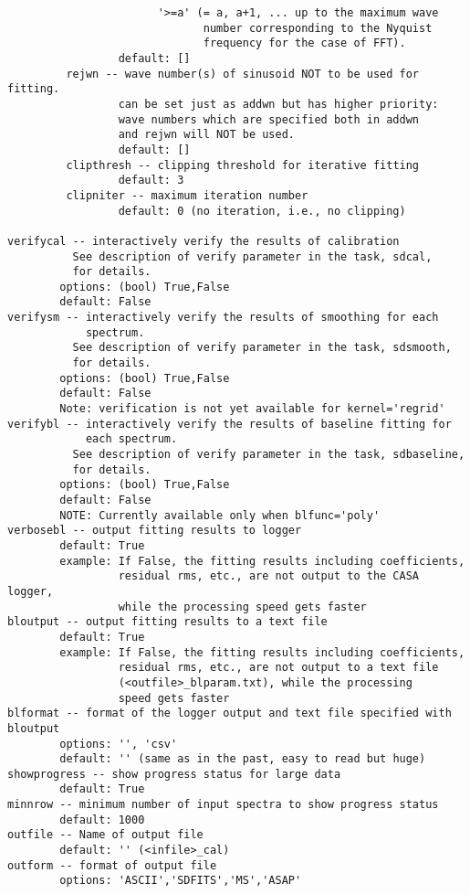 \begin{verbatim}
                       '>=a' (= a, a+1, ... up to the maximum wave
                              number corresponding to the Nyquist
                              frequency for the case of FFT).
                 default: []
         rejwn -- wave number(s) of sinusoid NOT to be used for fitting.
                 can be set just as addwn but has higher priority:
                 wave numbers which are specified both in addwn
                 and rejwn will NOT be used.
                 default: []
         clipthresh -- clipping threshold for iterative fitting
                 default: 3
         clipniter -- maximum iteration number
                 default: 0 (no iteration, i.e., no clipping)

verifycal -- interactively verify the results of calibration
          See description of verify parameter in the task, sdcal,
          for details.
        options: (bool) True,False
        default: False
verifysm -- interactively verify the results of smoothing for each
            spectrum.
          See description of verify parameter in the task, sdsmooth,
          for details.
        options: (bool) True,False
        default: False
        Note: verification is not yet available for kernel='regrid'
verifybl -- interactively verify the results of baseline fitting for
            each spectrum.
          See description of verify parameter in the task, sdbaseline,
          for details.
        options: (bool) True,False
        default: False
        NOTE: Currently available only when blfunc='poly'
verbosebl -- output fitting results to logger
        default: True
        example: If False, the fitting results including coefficients, 
                 residual rms, etc., are not output to the CASA logger, 
                 while the processing speed gets faster
bloutput -- output fitting results to a text file
        default: True
        example: If False, the fitting results including coefficients, 
                 residual rms, etc., are not output to a text file 
                 (<outfile>_blparam.txt), while the processing 
                 speed gets faster
blformat -- format of the logger output and text file specified with bloutput
        options: '', 'csv'
        default: '' (same as in the past, easy to read but huge)
showprogress -- show progress status for large data
        default: True
minnrow -- minimum number of input spectra to show progress status
        default: 1000
outfile -- Name of output file
        default: '' (<infile>_cal)
outform -- format of output file
        options: 'ASCII','SDFITS','MS','ASAP'

\end{verbatim}
